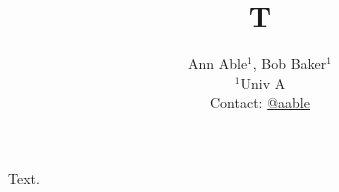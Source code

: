 \documentclass{article}
\title{T}
\author{Ann Able$^1$, Bob Baker$^1$ \\ $^1$Univ A \\ Contact: \href{https://x.com/aable}{@aable}}
\begin{document}
\maketitle
Text.
\end{document}
